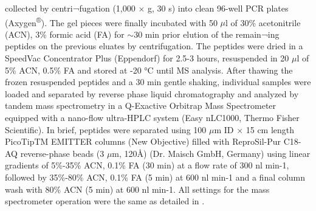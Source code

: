 collected by centri¬fugation (1,000 $\times$ g, 30 s) into clean 96-well PCR plates (Axygen\textsuperscript{®}). The gel pieces were finally incubated with 50 $\mu$l of 30\% acetonitrile (ACN), 3\% formic acid (FA) for $\sim$30 min prior elution of the remain¬ing peptides on the previous eluates by centrifugation. The peptides were dried in a SpeedVac Concentrator Plus (Eppendorf) for 2.5-3 hours, resuspended in 20 $\mu$l of 5\% ACN, 0.5\% FA and stored at -20 °C until MS analysis. After thawing the frozen resuspended peptides and a 30 min gentle shaking, individual samples were loaded and separated by reverse phase liquid chromatography and analyzed by tandem mass spectrometry in a Q-Exactive Orbitrap Mass Spectrometer equipped with a nano-flow ultra-HPLC system (Easy nLC1000, Thermo Fisher Scientific). In brief, peptides were separated using 100 $\mu$m ID $\times$ 15 cm length PicoTipTM EMITTER columns (New Objective) filled with ReproSil-Pur C18-AQ reverse-phase beads (3 $\mu$m, 120Å) (Dr. Maisch GmbH, Germany) using linear gradients of 5\%-35\% ACN, 0.1\% FA (30 min) at a flow rate of 300 nl min-1, followed by 35\%-80\% ACN, 0.1\% FA (5 min) at 600 nl min-1 and a final column wash with 80\% ACN (5 min) at 600 nl min-1. All settings for the mass spectrometer operation were the same as detailed in \cite{RN34}.
